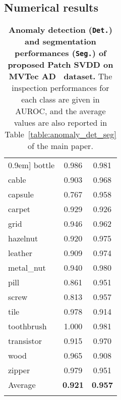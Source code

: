 \documentclass[runningheads]{llncs}
\begin{document}
\subsection{Numerical results} \label{sec:appendix_numerical}
\setlength{\tabcolsep}{0.12in}
\begin{table}[H]
  \centering
  \caption{\textbf{Anomaly detection (\texttt{Det.}) and segmentation performances (\texttt{Seg.}) of proposed Patch SVDD on MVTec AD~\cite{mvtecad} dataset.} The inspection performances for each class are given in AUROC, and the average values are also reported in Table~\ref{table:anomaly_det_seg} of the main paper.}
  \vspace{0.5em}
    \begin{tabular}
    {l @{\hskip 0.1in} |c c}
    \Xhline{1pt}\-0.9em]
    bottle         & 0.986 & 0.981 \\
    cable          & 0.903 & 0.968 \\
    capsule        & 0.767 & 0.958 \\
    carpet         & 0.929 & 0.926 \\
    grid           & 0.946 & 0.962 \\
    hazelnut       & 0.920 & 0.975 \\
    leather        & 0.909 & 0.974 \\
    metal\_nut     & 0.940 & 0.980 \\
    pill           & 0.861 & 0.951 \\
    screw          & 0.813 & 0.957 \\
    tile           & 0.978 & 0.914 \\
    toothbrush     & 1.000 & 0.981 \\
    transistor     & 0.915 & 0.970 \\
    wood           & 0.965 & 0.908 \\
    zipper         & 0.979 & 0.951 \\
    \Xhline{0.5pt}
    Average        & \textbf{0.921} & \textbf{0.957} \\
    \Xhline{0.5pt}
\end{tabular}\vspace{0.5mm}
  
  \label{table:auroc_full}
\end{table} 
\setlength{\tabcolsep}{0.12in}
\end{document}
